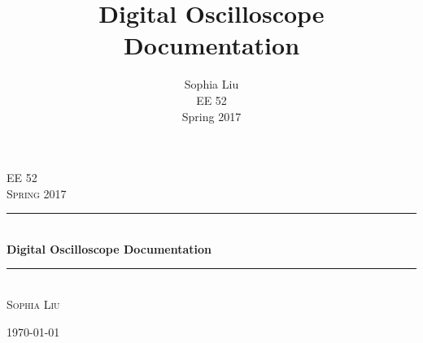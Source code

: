 \documentclass[12pt]{refart} %
\title{Digital Oscilloscope Documentation}
\author{Sophia Liu \\
	EE 52 \\
	Spring 2017}
\date{} %
\begin{document}
\begin{fullpage}
\begin{titlepage} %
	\newcommand{\HRule}{\rule{\linewidth}{0.5mm}} %
	
	\center %
	
	
	
	\textsc{\Large EE 52}\\[0.5cm] %
	
	\textsc{\large Spring 2017}\\[0.5cm] %
	
	
	\HRule\\[0.4cm]
	
	{\huge\bfseries Digital Oscilloscope Documentation}\\[0.4cm] %
	
	\HRule\\[1.0cm]
	

	{\large
	\textsc{Sophia Liu}} %
	
	
	\vfill\vfill\vfill %
	
	{\large\today} %
	
	
	
	
	\vfill %
	
\end{titlepage} 
\end{fullpage}
\end{document}
